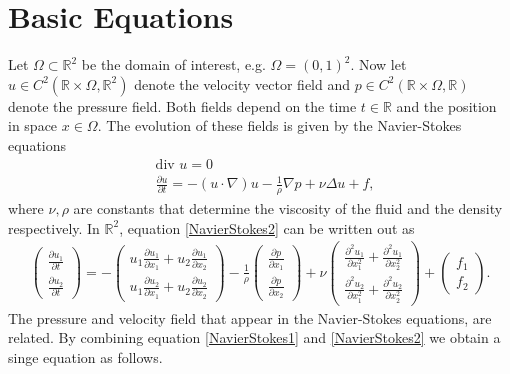 \documentclass[a4paper,10pt,oneside,final,german,openbib,pdftex,titlepage]{scrbook}
\begin{document}
\section{Basic Equations}
Let $\Omega \subset \mathbb{R}^2$ be the domain of interest, e.g. $\Omega = (0,1)^2$. Now let $u \in C^2(\mathbb{R} \times \Omega,\mathbb{R}^2)$ denote the velocity vector field and $p\in C^2(\mathbb{R} \times \Omega,\mathbb{R})$ denote the pressure field. Both fields depend on the time $t\in \mathbb{R}$ and the position in space $x\in \Omega$. The evolution of these fields is given by the Navier-Stokes equations
\begin{align}
	&\text{div } u = 0 \label{NavierStokes1}
	\\
	&\frac{\partial u}{\partial t} = - (u \cdot \nabla)u - \frac{1}{\rho}\nabla p + \nu \Delta u + f, \label{NavierStokes2}
\end{align}
where $\nu, \rho$ are constants that determine the viscosity of the fluid and the density respectively.
In $\mathbb{R}^2$, equation \ref{NavierStokes2} can be written out as
\begin{align*}
	\left( \begin{matrix}
	\frac{\partial u_1}{\partial t} \\ \frac{\partial u_2}{\partial t}
	\end{matrix} \right) = - \left(\begin{matrix}
	u_1 \frac{\partial u_1}{\partial x_1} + u_2 \frac{\partial u_1}{\partial x_2} \\ u_1 \frac{\partial u_2}{\partial x_1} + u_2 \frac{\partial u_2}{\partial x_2}
	\end{matrix} \right)  - \frac{1}{\rho} \left( \begin{matrix}
	\frac{\partial p}{\partial x_1} \\ \frac{\partial p}{\partial x_2}
\end{matrix}\right)	 + \nu \left( \begin{matrix}
	\frac{\partial^2 u_1}{\partial x_1^2} + \frac{\partial^2 u_1}{\partial x_2^2} \\ \frac{\partial^2 u_2}{\partial x_1^2} + \frac{\partial^2 u_2}{\partial x_2^2}
	\end{matrix} \right) + \left( \begin{matrix}
	f_1 \\ f_2
	\end{matrix} \right).
\end{align*}
The pressure and velocity field that appear in the Navier-Stokes equations, are related. By combining equation \ref{NavierStokes1} and \ref{NavierStokes2} we obtain a singe equation as follows.\\
\end{document}

